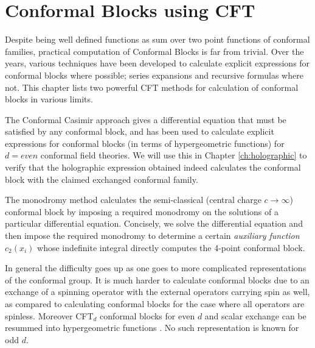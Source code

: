 
\chapter{Conformal Blocks using CFT}

Despite being well defined functions as sum over two point functions of conformal families, practical computation of Conformal Blocks is far from trivial. Over the years, various techniques have been developed to calculate explicit expressions for conformal blocks where possible; series expansions and recursive formulas where not. This chapter lists two powerful CFT methods for calculation of conformal blocks in various limits. 

The Conformal Casimir approach gives a differential equation that must be satisfied by any conformal block, and has been used to calculate explicit expressions for conformal blocks (in terms of hypergeometric functions) for $d=even$ conformal field theories. We will use this in Chapter \ref{ch:holographic} to verify that the holographic expression obtained indeed calculates the conformal block with the claimed exchanged conformal family.

The monodromy method calculates the semi-classical (central charge $c \to \infty$) conformal block by imposing a required monodromy on the solutions of a particular differential equation. Concisely, we solve the differential equation and then impose the required monodromy to determine a certain \emph{auxiliary function} $c_2(x_i)$ whose indefinite integral directly computes the 4-point conformal block. 

In general the difficulty goes up as one goes to more complicated representations of the conformal group. It is much harder to calculate conformal blocks due to an exchange of a spinning operator with the external operators carrying spin as well, as compared to calculating conformal blocks for the case where all operators are spinless. Moreover CFT$_d$ conformal blocks for even $d$ and scalar exchange can be resummed into hypergeometric functions \cite{Hijano:2015zsa}. No such representation is known for odd $d$.

